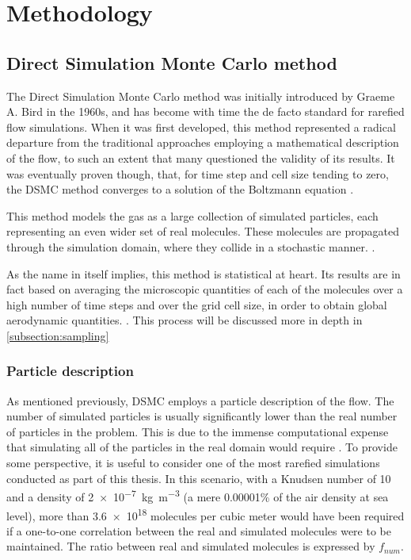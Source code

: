 \section{Methodology}
\subsection{Direct Simulation Monte Carlo method}
The Direct Simulation Monte Carlo method  was initially introduced by Graeme A. Bird in the 1960s, and has become with time the de facto standard for rarefied flow simulations. When it was first developed, this method represented a radical departure from the traditional approaches employing a mathematical description of the flow, to such an extent that many questioned the validity of its results. It was eventually proven though, that, for time step and cell size tending to zero, the DSMC method converges to a solution of the Boltzmann equation \cite{bird}.

This method models the gas as a large collection of simulated particles, each representing an even wider set of real molecules. These molecules are propagated through the simulation domain, where they collide in a stochastic manner. \cite{themontecarlo}.

As the name in itself implies, this method is statistical at heart. Its results are in fact based on averaging the microscopic quantities of each of the molecules over a high number of time steps and over the grid cell size, in order to obtain global aerodynamic quantities. \cite{bird, themontecarlo}. This process will be discussed more in depth in \autoref{subsection:sampling}

\subsubsection{Particle description}
As mentioned previously, DSMC employs a particle description of the flow. The number of simulated particles is usually significantly lower than the real number of particles in the problem. This is due to the immense computational expense that simulating all of the particles in the real domain would require \cite{natodsmc}. To provide some perspective, it is useful to consider one of the most rarefied simulations conducted as part of this thesis. In this scenario, with a Knudsen number of 10 and a density of \SI{2e-7}{\kg\per\meter^3} (a mere 0.00001\% of the air density at sea level), more than \SI{3.6e18}{} molecules per cubic meter would have been required if a one-to-one correlation between the real and simulated molecules were to be maintained. The ratio between real and simulated molecules is expressed by $f_{num}$.

